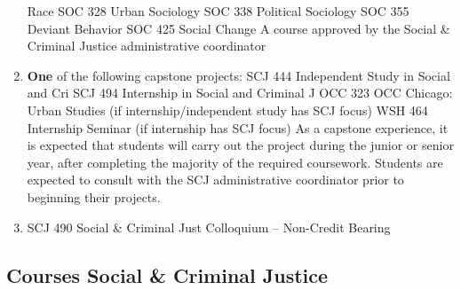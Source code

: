 \documentclass[
  letterpaper,
]{scrbook}
\begin{document}
\begin{enumerate}
  Race SOC 328 Urban Sociology SOC 338 Political Sociology SOC 355
  Deviant Behavior SOC 425 Social Change A course approved by the Social
  \& Criminal Justice administrative coordinator
\item
  \textbf{One} of the following capstone projects: SCJ 444 Independent
  Study in Social and Cri SCJ 494 Internship in Social and Criminal J
  OCC 323 OCC Chicago: Urban Studies (if internship/independent study
  has SCJ focus) WSH 464 Internship Seminar (if internship has SCJ
  focus) As a capstone experience, it is expected that students will
  carry out the project during the junior or senior year, after
  completing the majority of the required coursework. Students are
  expected to consult with the SCJ administrative coordinator prior to
  beginning their projects.
\item
  SCJ 490 Social \& Criminal Just Colloquium -- Non-Credit Bearing
\end{enumerate}

\hypertarget{courses-social-criminal-justice}{%
\subsection{Courses Social \& Criminal
Justice}\label{courses-social-criminal-justice}}
\end{document}
